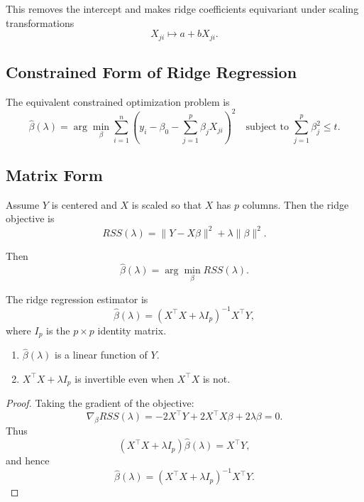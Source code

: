 This removes the intercept and makes ridge coefficients equivariant under scaling transformations
\[
    X_{ji} \mapsto a + b X_{ji}.
\]

\subsection{Constrained Form of Ridge Regression}

The equivalent constrained optimization problem is
\[
    \hat{\beta}(\lambda)
    =
    \arg\min_{\beta}
    \sum_{i=1}^n
        \left( y_i - \beta_0 - \sum_{j=1}^p \beta_j X_{ji} \right)^2
    \quad \text{subject to } \sum_{j=1}^p \beta_j^2 \le t.
\]

\subsection{Matrix Form}

Assume $Y$ is centered and $X$ is scaled so that $X$ has $p$ columns. Then the ridge objective is
\[
    RSS(\lambda)
    =
    \| Y - X \beta \|^2 + \lambda \|\beta\|^2.
\]

Then
\[
    \hat{\beta}(\lambda)
    = \arg\min_{\beta} RSS(\lambda).
\]

\begin{result}
The ridge regression estimator is
\[
    \hat{\beta}(\lambda)
    = (X^{\top} X + \lambda I_p)^{-1} X^{\top} Y,
\]
where $I_p$ is the $p \times p$ identity matrix.

\begin{enumerate}
    \item $\hat{\beta}(\lambda)$ is a linear function of $Y$.
    \item $X^{\top} X + \lambda I_p$ is invertible even when $X^{\top} X$ is not.
\end{enumerate}
\end{result}

\begin{proof}
Taking the gradient of the objective:
\[
    \nabla_{\beta} RSS(\lambda)
    = -2 X^{\top} Y + 2 X^{\top} X \beta + 2 \lambda \beta = 0.
\]
Thus
\[
    (X^{\top} X + \lambda I_p)\hat{\beta}(\lambda) = X^{\top} Y,
\]
and hence
\[
    \hat{\beta}(\lambda)
    = (X^{\top} X + \lambda I_p)^{-1} X^{\top} Y.
\]
\end{proof}

\newpage